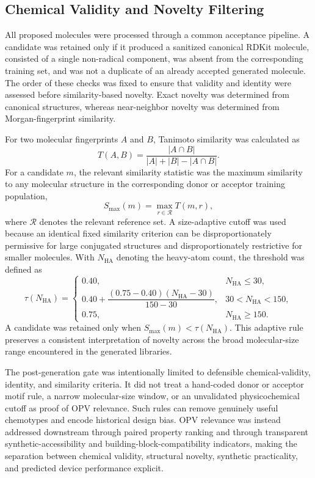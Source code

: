 \documentclass[12pt]{article}
\begin{document}
\subsection{Chemical Validity and Novelty Filtering}
All proposed molecules were processed through a common acceptance pipeline. A candidate was retained only if it produced a sanitized canonical RDKit molecule, consisted of a single non-radical component, was absent from the corresponding training set, and was not a duplicate of an already accepted generated molecule. The order of these checks was fixed to ensure that validity and identity were assessed before similarity-based novelty. Exact novelty was determined from canonical structures, whereas near-neighbor novelty was determined from Morgan-fingerprint similarity.

For two molecular fingerprints $A$ and $B$, Tanimoto similarity was calculated as
\begin{equation}
T(A,B)=\frac{|A\cap B|}{|A|+|B|-|A\cap B|}.
\end{equation}
For a candidate $m$, the relevant similarity statistic was the maximum similarity to any molecular structure in the corresponding donor or acceptor training population,
\begin{equation}
S_{\max}(m)=\max_{r\in\mathcal{R}} T(m,r),
\end{equation}
where $\mathcal{R}$ denotes the relevant reference set. A size-adaptive cutoff was used because an identical fixed similarity criterion can be disproportionately permissive for large conjugated structures and disproportionately restrictive for smaller molecules. With $N_{\mathrm{HA}}$ denoting the heavy-atom count, the threshold was defined as
\begin{equation}
\tau(N_{\mathrm{HA}})=
\begin{cases}
0.40, & N_{\mathrm{HA}}\leq 30,\\
0.40+\dfrac{(0.75-0.40)(N_{\mathrm{HA}}-30)}{150-30}, 
  & 30<N_{\mathrm{HA}}<150,\\
0.75, & N_{\mathrm{HA}}\geq 150.
\end{cases}
\end{equation}
A candidate was retained only when $S_{\max}(m)<\tau(N_{\mathrm{HA}})$. This adaptive rule preserves a consistent interpretation of novelty across the broad molecular-size range encountered in the generated libraries.

The post-generation gate was intentionally limited to defensible 
chemical-validity, identity, and similarity criteria. It did not treat a hand-coded donor or acceptor motif rule, a narrow molecular-size window, or an unvalidated physicochemical cutoff as proof of OPV relevance. Such rules can remove genuinely useful chemotypes and encode historical design bias. OPV relevance was instead addressed downstream through paired property ranking and through transparent synthetic-accessibility and building-block-compatibility indicators, making the separation between chemical validity, structural novelty, 
synthetic practicality, and predicted device performance explicit.
\end{document}
